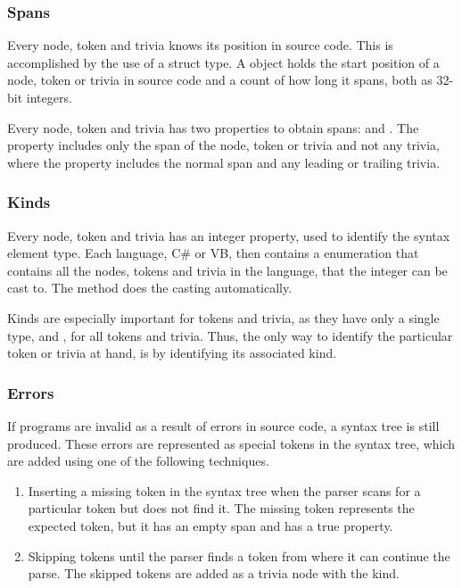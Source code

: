 \subsubsection{Spans}
Every node, token and trivia knows its position in source code. This is accomplished by the use of a  struct type. A  object holds the start position of a node, token or trivia in source code and a count of how long it spans, both as 32-bit integers\cite[p. 8]{ng2012roslyn}.

Every node, token and trivia has two properties to obtain spans:  and . The  property includes only the span of the node, token or trivia and not any trivia, where the  property includes the normal span and any leading or trailing trivia.  

\subsubsection{Kinds}
Every node, token and trivia has an integer  property, used to identify the syntax element type. Each language, C\# or \ac{VB}, then contains a  enumeration that contains all the nodes, tokens and trivia in the language, that the integer can be cast to. The  method does the casting automatically\cite{roslynwikiOverview}\cite[p. 9]{ng2012roslyn}.

Kinds are especially important for tokens and trivia, as they have only a single type,  and , for all tokens and trivia. Thus, the only way to identify the particular token or trivia at hand, is by identifying its associated kind.

\subsubsection{Errors}
If programs are invalid as a result of errors in source code, a syntax tree is still produced. These errors are represented as special tokens in the syntax tree, which are added using one of the following techniques\cite[p. 9]{ng2012roslyn}.
\begin{enumerate}
\item Inserting a missing token in the syntax tree when the parser scans for a particular token but does not find it. The missing token represents the expected token, but it has an empty span and has a true  property.
\item Skipping tokens until the parser finds a token from where it can continue the parse. The skipped tokens are added as a trivia node with the  kind.
\end{enumerate}

